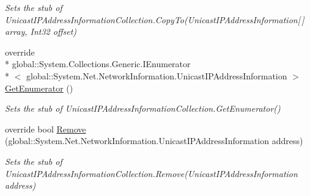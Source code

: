 \begin{DoxyCompactItemize}
\begin{DoxyCompactList}\small\item\em Sets the stub of Unicast\-I\-P\-Address\-Information\-Collection.\-Copy\-To(\-Unicast\-I\-P\-Address\-Information\mbox{[}$\,$\mbox{]} array, Int32 offset)\end{DoxyCompactList}\item 
override \\*
global\-::\-System.\-Collections.\-Generic.\-I\-Enumerator\\*
$<$ global\-::\-System.\-Net.\-Network\-Information.\-Unicast\-I\-P\-Address\-Information $>$ \hyperlink{class_system_1_1_net_1_1_network_information_1_1_fakes_1_1_stub_unicast_i_p_address_information_collection_adb46d5e606245dbba817706175ee0bf4}{Get\-Enumerator} ()
\begin{DoxyCompactList}\small\item\em Sets the stub of Unicast\-I\-P\-Address\-Information\-Collection.\-Get\-Enumerator()\end{DoxyCompactList}\item 
override bool \hyperlink{class_system_1_1_net_1_1_network_information_1_1_fakes_1_1_stub_unicast_i_p_address_information_collection_a7c0092714f40577b09e4dc46a2f1c7b5}{Remove} (global\-::\-System.\-Net.\-Network\-Information.\-Unicast\-I\-P\-Address\-Information address)
\begin{DoxyCompactList}\small\item\em Sets the stub of Unicast\-I\-P\-Address\-Information\-Collection.\-Remove(\-Unicast\-I\-P\-Address\-Information address)\end{DoxyCompactList}\end{DoxyCompactItemize}
